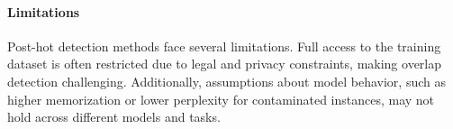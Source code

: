 

\paragraph{Limitations}
Post-hot detection methods face several limitations. Full access to the training dataset is often restricted due to legal and privacy constraints, making overlap detection challenging. Additionally, assumptions about model behavior, such as higher memorization or lower perplexity for contaminated instances, may not hold across different models and tasks.

